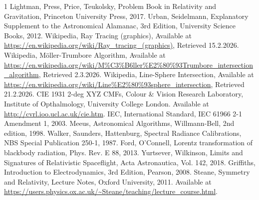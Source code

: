 \documentclass [12pt, a4paper] {article}
\begin{document}
\newpage

\begin {thebibliography}{1}
    Lightman, Press, Price, Teukolsky, Problem Book in Relativity and Gravitation, 
    Princeton University Press, 2017.
    Urban, Seidelmann, Explanatory Supplement to the Astronomical Alamanac, 
    3rd Edition, University Science Books, 2012.
    Wikipedia, Ray Tracing (graphics), Available at \\
    \url{https://en.wikipedia.org/wiki/Ray_tracing_(graphics)},
    Retrieved 15.2.2026.
    Wikipedia, M{\"o}ller-Trumbore Algorithm, Available at \\
    \url{https://en.wikipedia.org/wiki/M%C3%B6ller%E2%80%93Trumbore_intersection_algorithm},
    Retrieved 2.3.2026.
    Wikipedia, Line-Sphere Intersection, Available at \\
    \url{https://en.wikipedia.org/wiki/Line%E2%80%93sphere_intersection},
    Retrieved 21.2.2026.
    CIE 1931 2-deg XYZ CMFs, Colour \& Vision Research Laboratory, 
    Institute of Opthalmology, University College London. Available at 
    \url{http://cvrl.ioo.ucl.ac.uk/cie.htm}.
    IEC, International Standard, IEC 61966 2-1 Amendment 1, 2003.
    Meeus, Astronomical Algorithms, Willmann-Bell, 2nd edition, 1998.
    Walker, Saunders, Hattenburg, Spectral Radiance Calibrations, 
    NBS Special Publication 250-1, 1987.
    Ford, O'Connell, Lorentz transformation of blackbody radiation, 
    Phys. Rev. E 88, 2013.
    Yurtsever, Wilkinson, Limits and Signatures of Relativistic Spaceflight,
    Acta Astronautica, Vol. 142, 2018.
    Griffiths, Introduction to Electrodynamics, 3rd Edition, Pearson, 2008.
    Steane, Symmetry and Relativity, Lecture Notes, Oxford University, 2011.
    Available at \url{https://users.physics.ox.ac.uk/~Steane/teaching/lecture_course.html}.
\end {thebibliography}
\end{document}
